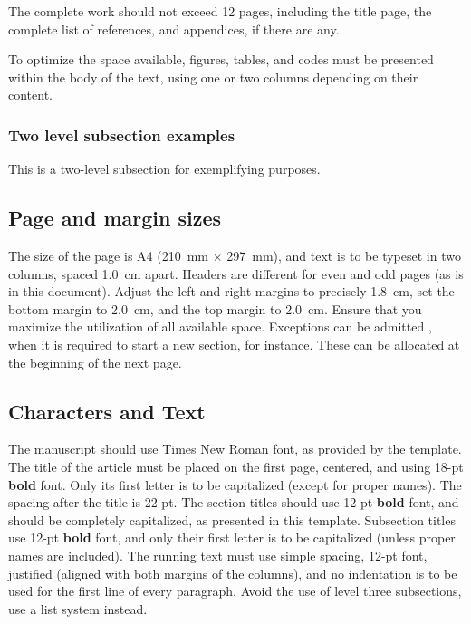 \documentclass[12pt, a4paper, twoside, twocolumn]{article}
\begin{document}
The complete work should not exceed 12 pages, including the title page, the complete list of references, and appendices, if there are any.

To optimize the space available, figures, tables, and codes must be presented within the body of the text, using one or two columns depending on their content.

\subsubsection{Two level subsection examples}

This is a two-level subsection for exemplifying purposes.

\subsection{Page and margin sizes}

The size of the page is A4 (210~mm $\times$ 297~mm), and text is to be typeset in two columns, spaced 1.0~cm apart. Headers are different for even and odd pages (as is in this document). Adjust the left and right margins to precisely 1.8~cm, set the bottom margin to 2.0~cm, and the top margin to 2.0~cm. Ensure that you maximize the utilization of all available space. Exceptions can be admitted \eg, when it is required to start a new section, for instance. These can be allocated at the beginning of the next page.

\subsection{Characters and Text}

The manuscript should use Times New Roman font, as provided by the template. The title of the article must be placed on the first page, centered, and using 18-pt \textbf{bold} font. Only its first letter is to be capitalized (except for proper names). The spacing after the title is 22-pt. The section titles should use  12-pt \textbf{bold} font, and should be completely capitalized, as presented in this template. Subsection titles use 12-pt \textbf{bold} font, and only their first letter is to be capitalized (unless proper names are included). The running text must use simple spacing, 12-pt font, justified (aligned with both margins of the columns), and no indentation is to be used for the first line of every paragraph. Avoid the use of level three subsections, use a list system instead.
\end{document}
